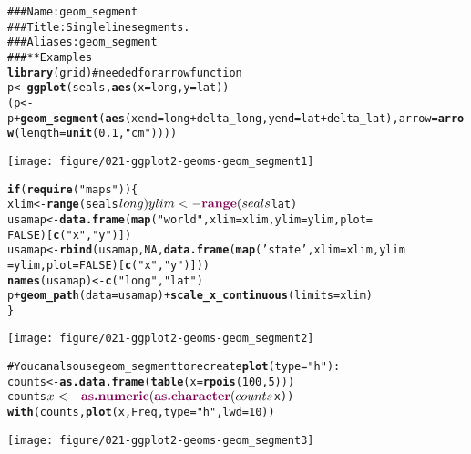 \documentclass[a4paper,titlepage]{tufte-handout}\usepackage{graphicx, color}
\makeatletter
\def\maxwidth{ %
  \ifdim\Gin@nat@width>\linewidth
    \linewidth
  \else
    \Gin@nat@width
  \fi
}
\newcommand{\hlfunctioncall}[1]{\textcolor[rgb]{0.501960784313725,0,0.329411764705882}{\textbf{#1}}}%
\newcommand{\hlstring}[1]{\textcolor[rgb]{0.6,0.6,1}{#1}}%
\newcommand{\hlcomment}[1]{\textcolor[rgb]{0.180392156862745,0.6,0.341176470588235}{#1}}%
\newenvironment{kframe}{%
 \def\at@end@of@kframe{}%
 \ifinner\ifhmode%
  \def\at@end@of@kframe{\end{minipage}}%
  \begin{minipage}{\columnwidth}%
 \fi\fi%
 \def\FrameCommand##1{\hskip\@totalleftmargin \hskip-\fboxsep
 \colorbox{shadecolor}{##1}\hskip-\fboxsep
     \hskip-\linewidth \hskip-\@totalleftmargin \hskip\columnwidth}%
 \MakeFramed {\advance\hsize-\width
   \@totalleftmargin\z@ \linewidth\hsize
   \@setminipage}}%
 {\par\unskip\endMakeFramed%
 \at@end@of@kframe}
\newenvironment{knitrout}{}{} %
\makeatother
\begin{document}
\begin{knitrout}
\color{fgcolor}\begin{kframe}
\begin{alltt}
\hlcomment{### Name: geom_segment}
\hlcomment{### Title: Single line segments.}
\hlcomment{### Aliases: geom_segment}
\hlcomment{### ** Examples}
\hlfunctioncall{library}(grid) \hlcomment{# needed for arrow function}
p <- \hlfunctioncall{ggplot}(seals, \hlfunctioncall{aes}(x = long, y = lat))
(p <- p + \hlfunctioncall{geom_segment}(\hlfunctioncall{aes}(xend = long + delta_long, yend = lat + delta_lat), arrow = \hlfunctioncall{arrow}(length = \hlfunctioncall{unit}(0.1,\hlstring{"cm"}))))
\end{alltt}
\end{kframe}\texttt{[image: figure/021-ggplot2-geoms-geom\_segment1]} \begin{kframe}\begin{alltt}
\hlfunctioncall{if} (\hlfunctioncall{require}(\hlstring{"maps"})) \{
xlim <- \hlfunctioncall{range}(seals$long)
ylim <- \hlfunctioncall{range}(seals$lat)
usamap <- \hlfunctioncall{data.frame}(\hlfunctioncall{map}(\hlstring{"world"}, xlim = xlim, ylim = ylim, plot =
FALSE)[\hlfunctioncall{c}(\hlstring{"x"},\hlstring{"y"})])
usamap <- \hlfunctioncall{rbind}(usamap, NA, \hlfunctioncall{data.frame}(\hlfunctioncall{map}(\hlstring{'state'}, xlim = xlim, ylim
= ylim, plot = FALSE)[\hlfunctioncall{c}(\hlstring{"x"},\hlstring{"y"})]))
\hlfunctioncall{names}(usamap) <- \hlfunctioncall{c}(\hlstring{"long"}, \hlstring{"lat"})
p + \hlfunctioncall{geom_path}(data = usamap) + \hlfunctioncall{scale_x_continuous}(limits = xlim)
\}
\end{alltt}
\end{kframe}\texttt{[image: figure/021-ggplot2-geoms-geom\_segment2]} \begin{kframe}\begin{alltt}
# You can also use geom_segment to recreate \hlfunctioncall{plot}(type = \hlstring{"h"}) :
counts <- \hlfunctioncall{as.data.frame}(\hlfunctioncall{table}(x = \hlfunctioncall{rpois}(100,5)))
counts$x <- \hlfunctioncall{as.numeric}(\hlfunctioncall{as.character}(counts$x))
\hlfunctioncall{with}(counts, \hlfunctioncall{plot}(x, Freq, type = \hlstring{"h"}, lwd = 10))
\end{alltt}
\end{kframe}\texttt{[image: figure/021-ggplot2-geoms-geom\_segment3]} \begin{kframe}\begin{alltt}

\end{alltt}
\end{kframe}
\end{knitrout}
\end{document}

